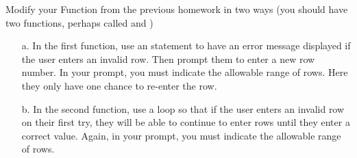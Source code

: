{Modify your  Function from the previous homework in two ways (you should have two functions, perhaps called  and )
\begin{enumerate}
\item[a.] In the first function, use an  statement to have an error message displayed if the user enters an invalid row.  Then prompt them to enter a new row number.  In your prompt, you must indicate the allowable range of rows.  Here they only have one chance to re-enter the row.
\item[b.] In the second function, use a  loop so that if the user enters an invalid row on their first try, they will be able to continue to enter rows until they enter a correct value.  Again, in your prompt, you must indicate the allowable range of rows. 
\end{enumerate}}
{}



